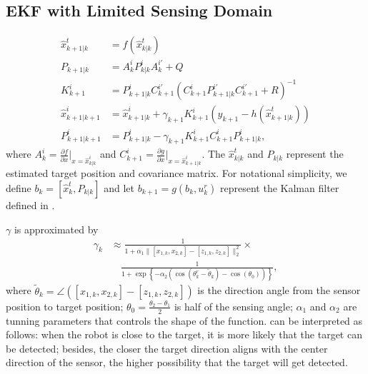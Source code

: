 \documentclass[letterpaper, 10 pt, conference]{ieeeconf}  %
\begin{document}
\subsection{EKF with Limited Sensing Domain}\label{subseq:KF with FOV}
\begin{subequations}\label{eqn:KF}
	\begin{align}
	\hat{x}^t_{k+1|k}&=f(\hat{x}^t_{k|k})\\
	P_{k+1|k}&=A^i_kP^i_{k|k}A^{i'}_k+Q\\
	K^i_{k+1}&=P^i_{k+1|k}C^{i'}_{k+1}(C^i_{k+1}P^{i'}_{k+1|k}C^{i'}_{k+1}+R)^{-1}\\
	\hat{x}^i_{k+1|k+1}&=\hat{x}^i_{k+1|k}+\gamma_{k+1}K^i_{k+1}(y_{k+1}-h(\hat{x}^t_{k+1|k}))\label{subeqn:upd_mean}\\
	P^i_{k+1|k+1}&=P^i_{k+1|k}-\gamma_{k+1}K^i_{k+1}C^i_{k+1}P^i_{k+1|k}\label{subeqn:upd_cov},
	\end{align}
\end{subequations}
where $A^i_k=\frac{\partial f}{\partial x}|_{x=\hat{x}^i_{k|k}}$ and $C^i_{k+1}=\frac{\partial g}{\partial x}|_{x=\hat{x}^i_{k+1|k}}$. 
The $\hat{x}^t_{k|k}$ and $P_{k|k}$ represent the estimated target position and covariance matrix.
For notational simplicity, we define $b_k=[\hat{x}^t_k,P_{k|k}]$ and let $b_{k+1}=g(b_k,u^r_k)$ represent the Kalman filter defined in .

$\gamma$ is approximated by
\begin{equation}\label{eqn:gamma}
\begin{split}
\gamma_{k}&\approx \frac{1}{1+\alpha_1\|[x_{1,k},x_{2,k}]-[z_{1,k},z_{2,k}]\|_2^2}\times\\
&\quad\frac{1}{1+\exp{\left\lbrace-\alpha_2(\cos(\theta^r_k-\tilde{\theta}_k)-\cos(\theta_0))\right\rbrace}},
\end{split}
\end{equation}
where $\tilde{\theta}_k=\angle([x_{1,k},x_{2,k}]-[z_{1,k},z_{2,k}])$ is the direction angle from the sensor position to target position; $\theta_0=\frac{\theta_2-\theta_1}{2}$ is half of the sensing angle; $\alpha_1$ and $\alpha_2$ are tunning parameters that controls the shape of the function. 
 can be interpreted as follows:
when the robot is close to the target, it is more likely that the target can be detected; besides, the closer the target direction aligns with the center direction of the sensor, the higher possibility that the target will get detected.
\end{document}
